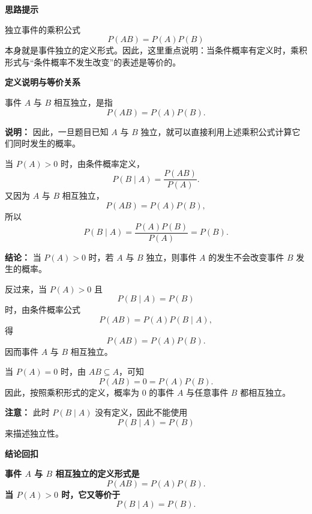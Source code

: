 \begin{proofbox}

	\textbf{\textcolor{CProof}{思路提示}}

	独立事件的乘积公式
	\[
		P(AB)=P(A)P(B)
	\]
	本身就是事件独立的定义形式。因此，这里重点说明：当条件概率有定义时，乘积形式与“条件概率不发生改变”的表述是等价的。

	\medskip

	\textbf{\textcolor{CProof}{定义说明与等价关系}}

	\begin{description}[style=nextline, leftmargin=2.8em, labelsep=0.5em, itemsep=0.55em]

		\item[\textbf{步骤一（独立性的定义形式）：}]
		      事件 $A$ 与 $B$ 相互独立，是指
		      \[
			      P(AB)=P(A)P(B).
		      \]

		      \par\textbf{说明：}
		      因此，一旦题目已知 $A$ 与 $B$ 独立，就可以直接利用上述乘积公式计算它们同时发生的概率。

		\item[\textbf{步骤二（由独立推出条件概率不变）：}]
		      当 $P(A)>0$ 时，由条件概率定义，
		      \[
			      P(B\mid A)=\frac{P(AB)}{P(A)}.
		      \]
		      又因为 $A$ 与 $B$ 相互独立，
		      \[
			      P(AB)=P(A)P(B),
		      \]
		      所以
		      \[
			      P(B\mid A)
			      =
			      \frac{P(A)P(B)}{P(A)}
			      =
			      P(B).
		      \]

		      \par\textbf{结论：}
		      当 $P(A)>0$ 时，若 $A$ 与 $B$ 独立，则事件 $A$ 的发生不会改变事件 $B$ 发生的概率。

		\item[\textbf{步骤三（由条件概率不变推出独立）：}]
		      反过来，当 $P(A)>0$ 且
		      \[
			      P(B\mid A)=P(B)
		      \]
		      时，由条件概率公式
		      \[
			      P(AB)=P(A)P(B\mid A),
		      \]
		      得
		      \[
			      P(AB)=P(A)P(B).
		      \]
		      因而事件 $A$ 与 $B$ 相互独立。

		\item[\textbf{步骤四（零概率事件的特别说明）：}]
		      当 $P(A)=0$ 时，由 $AB\subseteq A$，可知
		      \[
			      P(AB)=0=P(A)P(B).
		      \]
		      因此，按照乘积形式的定义，概率为 $0$ 的事件 $A$ 与任意事件 $B$ 都相互独立。

		      \par\textbf{注意：}
		      此时 $P(B\mid A)$ 没有定义，因此不能使用
		      \[
			      P(B\mid A)=P(B)
		      \]
		      来描述独立性。

	\end{description}

	\medskip

	\textbf{\textcolor{CProof}{结论回扣}}

	\textbf{
		事件 $A$ 与 $B$ 相互独立的定义形式是
		\[
			P(AB)=P(A)P(B).
		\]
		当 $P(A)>0$ 时，它又等价于
		\[
			P(B\mid A)=P(B).
		\]
	}

\end{proofbox}